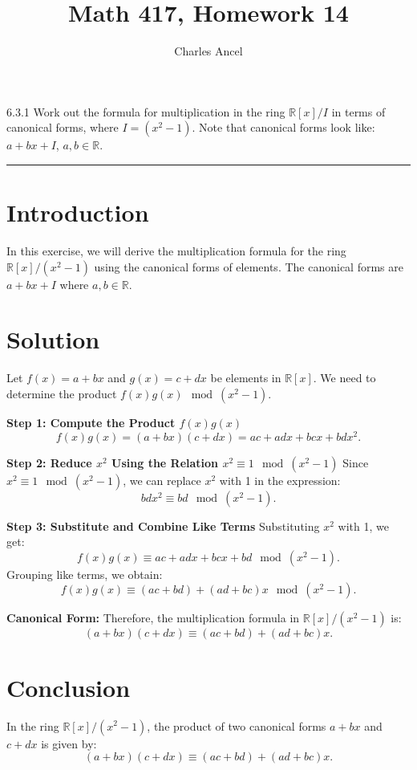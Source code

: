 \documentclass[12pt]{amsart}
\title{Math 417, Homework 14}
\author{Charles Ancel}
\theoremstyle{definition}
\numberwithin{equation}{section}
\newcommand{\R}{\mathbb{R}}
\begin{document}
\maketitle

\begin{exercise}{6.3.1} Work out the formula for multiplication in the ring \( \R[x]/I \) in terms of canonical forms, where \( I = (x^2 - 1) \). Note that canonical forms look like: \(a + bx + I\), \(a, b \in \R \).

    \noindent\rule{\linewidth}{1pt}

    \section*{Introduction}
    In this exercise, we will derive the multiplication formula for the ring \( \R[x]/(x^2 - 1) \) using the canonical forms of elements. The canonical forms are \(a + bx + I\) where \(a, b \in \R \).

    \section*{Solution}
    Let \(f(x) = a + bx\) and \(g(x) = c + dx\) be elements in \( \R[x] \). We need to determine the product \(f(x)g(x) \mod (x^2 - 1)\).

    \noindent \textbf{Step 1: Compute the Product \(f(x)g(x)\)}
    \[
    f(x)g(x) = (a + bx)(c + dx) = ac + adx + bcx + bdx^2.
    \]

    \noindent \textbf{Step 2: Reduce \(x^2\) Using the Relation \(x^2 \equiv 1 \mod (x^2 - 1)\)}
    Since \(x^2 \equiv 1 \mod (x^2 - 1)\), we can replace \(x^2\) with 1 in the expression:
    \[
    bdx^2 \equiv bd \mod (x^2 - 1).
    \]

    \noindent \textbf{Step 3: Substitute and Combine Like Terms}
    Substituting \(x^2\) with 1, we get:
    \[
    f(x)g(x) \equiv ac + adx + bcx + bd \mod (x^2 - 1).
    \]
    Grouping like terms, we obtain:
    \[
    f(x)g(x) \equiv (ac + bd) + (ad + bc)x \mod (x^2 - 1).
    \]

    \noindent \textbf{Canonical Form:}
    Therefore, the multiplication formula in \( \R[x]/(x^2 - 1) \) is:
    \[
    (a + bx)(c + dx) \equiv (ac + bd) + (ad + bc)x.
    \]

    \section*{Conclusion}
    In the ring \( \R[x]/(x^2 - 1) \), the product of two canonical forms \(a + bx\) and \(c + dx\) is given by:
    \[
    (a + bx)(c + dx) \equiv (ac + bd) + (ad + bc)x.
    \]

\end{exercise}
\end{document}
